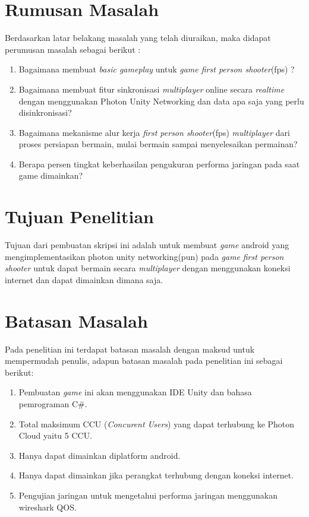 \section{Rumusan Masalah}
\noindent

Berdasarkan latar belakang masalah yang telah diuraikan, maka didapat perumusan masalah sebagai berikut :
\begin{enumerate}
	\item Bagaimana membuat \textit{basic gameplay} untuk \textit{game first person shooter}(fps) ?
	\item Bagaimana membuat fitur sinkronisasi \textit{multiplayer} online secara \textit{realtime} dengan menggunakan Photon Unity Networking dan data apa saja yang perlu disinkronisasi?
	\item Bagaimana mekanisme alur kerja \textit{first person shooter}(fps) \textit{multiplayer} dari proses persiapan bermain, mulai bermain sampai menyelesaikan permainan?
	\item Berapa persen tingkat keberhasilan pengukuran performa jaringan pada saat game dimainkan?
\end{enumerate}	
\section{Tujuan Penelitian}
\noindent

Tujuan dari pembuatan skripsi ini adalah untuk membuat \textit{\textit{game}} android yang mengimplementasikan photon unity networking(pun) pada \textit{\textit{game}} \textit{first person shooter} untuk dapat bermain secara \textit{multiplayer} dengan menggunakan koneksi internet dan dapat dimainkan dimana saja.

\section{Batasan Masalah}
Pada penelitian ini terdapat batasan masalah dengan maksud untuk mempermudah penulis, adapun batasan masalah pada penelitian ini sebagai berikut:
\begin{enumerate}
	\item Pembuatan \textit{\textit{game}} ini akan menggunakan IDE Unity dan bahasa pemrograman C\#.
	\item Total maksimum CCU (\textit{Concurent Users}) yang dapat terhubung ke Photon Cloud yaitu 5 CCU.
	\item Hanya dapat dimainkan diplatform android.
	\item Hanya dapat dimainkan jika perangkat terhubung dengan koneksi internet.
	\item Pengujian jaringan untuk mengetahui performa jaringan menggunakan wireshark QOS.
\end{enumerate}


